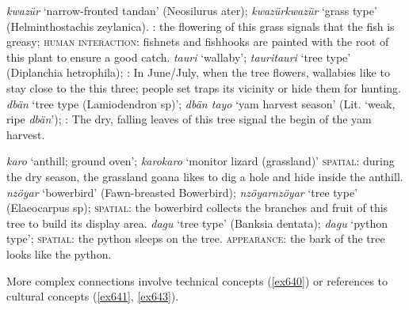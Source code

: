 \begin{exe}
\ex
\label{ex631}
\begin{xlist}
	\ex \label{ex632} \emph{kwazür} `narrow-fronted tandan' (Neosilurus ater); \emph{kwazürkwazür} `grass type' (Helminthostachis zeylanica). \textsc{:} the flowering of this grass signals that the fish is greasy; \textsc{human interaction:} fishnets and fishhooks are painted with the root of this plant to ensure a good catch.
	\ex \label{ex633} \emph{tauri} `wallaby'; \emph{tauritauri} `tree type' (Diplanchia hetrophila); \textsc{:} In June/July, when the tree flowers, wallabies like to stay close to the this three; people set traps its vicinity or hide them for hunting.
	\ex \label{ex634} \emph{dbän} `tree type (Lamiodendron sp)'; \emph{dbän tayo} `yam harvest season' (Lit. `weak, ripe \emph{dbän}'); \textsc{:} The dry, falling leaves of this tree signal the begin of the yam harvest.
\end{xlist}
\end{exe}%
\begin{exe}
\ex
\label{ex635}
\begin{xlist}
	\ex \label{ex636} \emph{karo} `anthill; ground oven'; \emph{karokaro} `monitor lizard (grassland)' \textsc{spatial:} during the dry season, the grassland goana likes to dig a hole and hide inside the anthill.
	\ex \label{ex637} \emph{nzöyar} `bowerbird' (Fawn-breasted Bowerbird); \emph{nzöyarnzöyar} `tree type' (Elaeocarpus sp); \textsc{spatial:} the bowerbird collects the branches and fruit of this tree to build its display area.
	\ex \label{ex638} \emph{dagu} `tree type' (Banksia dentata); \emph{dagu} `python type'; \textsc{spatial:} the python sleeps on the tree. \textsc{appearance:} the bark of the tree looks like the python.
\end{xlist}
\end{exe}%

More complex connections involve technical concepts (\ref{ex640}) or references to cultural concepts (\ref{ex641}, \ref{ex643}).

